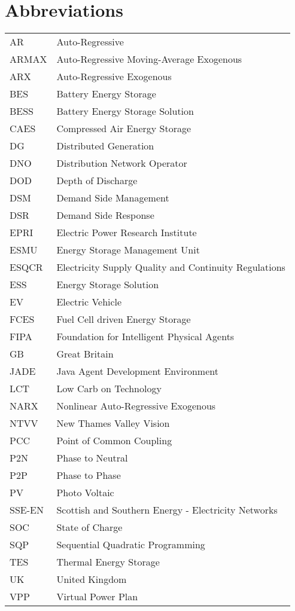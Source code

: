 \chapter*{Abbreviations}


\begin{table*}[hbt]
  \begin{tabular}{l l}
    AR & Auto-Regressive\\
    ARMAX & Auto-Regressive Moving-Average Exogenous\\
    ARX & Auto-Regressive Exogenous\\
    BES & Battery Energy Storage\\
    BESS & Battery Energy Storage Solution\\
    CAES & Compressed Air Energy Storage\\
    DG & Distributed Generation\\
    DNO & Distribution Network Operator\\
    DOD & Depth of Discharge\\
    DSM & Demand Side Management\\
    DSR & Demand Side Response\\
    EPRI & Electric Power Research Institute\\
    ESMU & Energy Storage Management Unit\\
    ESQCR & Electricity Supply Quality and Continuity Regulations\\
    ESS & Energy Storage Solution\\
    EV & Electric Vehicle\\
    FCES & Fuel Cell driven Energy Storage\\
    FIPA & Foundation for Intelligent Physical Agents\\
    GB & Great Britain\\
    JADE & Java Agent Development Environment\\
    LCT & Low Carb on Technology\\
    NARX & Nonlinear Auto-Regressive Exogenous\\
    NTVV & New Thames Valley Vision\\
    PCC & Point of Common Coupling\\
    P2N & Phase to Neutral\\
    P2P & Phase to Phase\\
    PV & Photo Voltaic\\
    SSE-EN & Scottish and Southern Energy - Electricity Networks\\
    SOC & State of Charge\\
    SQP & Sequential Quadratic Programming\\
    TES & Thermal Energy Storage\\
    UK & United Kingdom\\
    VPP & Virtual Power Plan
  \end{tabular}
\end{table*}
